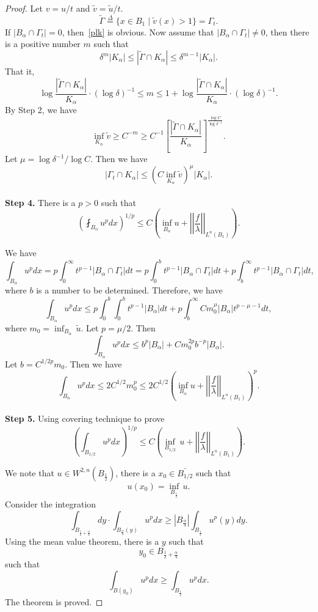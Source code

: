 \begin{proof}
Let $v=u/t$ and $\tilde v=\tilde u/t$.
\[
\tilde\Gamma\overset{\Delta}{=}\{x\in B_1\mid\tilde v(x)>1\}=\Gamma_t.
\]
If $|B_\alpha\cap\Gamma_t|=0$, then~\eqref{plk} is obvious. Now assume that $|B_\alpha\cap\Gamma_t|\neq 0$, then there is a positive number $m$ such that
\[
\delta^m|K_\alpha|\leq|\tilde\Gamma\cap K_\alpha|\leq\delta^{m-1}|K_\alpha|.
\]
That it, 
\[
\log\frac{|\tilde\Gamma\cap K_\alpha|}{K_\alpha}\cdot(\log\delta)^{-1}\leq m\leq
1+\log\frac{|\tilde\Gamma\cap K_\alpha|}{K_\alpha}\cdot(\log\delta)^{-1}.
\]
By Step 2, we have
\[
\inf_{K_\alpha}\tilde v\geq C^{-m}\geq C^{-1}\left[\frac{|\tilde\Gamma\cap K_\alpha|}{K_\alpha}\right]^{\frac{\log C}{\log \delta^{-1}}}.
\]
Let $\mu=\log\delta^{-1}/\log C$.
Then we have
\[
|\Gamma_t\cap K_\alpha|\leq (C\inf_{K_\alpha}\tilde v)^\mu|K_\alpha|.
\]\\


{\bf Step 4.} There is a $p>0$ such that
\[
\left(\fint_{B_\alpha}u^p dx\right)^{1/p}\leq C\left(
\inf_{B_\alpha} u+\left|\left|\frac f\lambda\right|\right|_{L^n(B_1)}\right).
\]

We have
\[
\int_{B_{\alpha}} u^p dx=p\int_0^\infty t^{p-1}|B_\alpha\cap\Gamma_t| dt
=p\int_0^b  t^{p-1}|B_\alpha\cap\Gamma_t| dt+p\int_b^\infty  t^{p-1}|B_\alpha\cap\Gamma_t| dt,
\]
where $b$ is a number to be determined. Therefore, we have
\[
\int_{B_{\alpha}} u^p dx\leq p\int_0^b\int_0^b t^{p-1}|B_\alpha| dt+p\int_b^\infty Cm_0^\mu|B_\alpha| t^{p-\mu-1} dt,
\]
where $m_0={\displaystyle \inf_{B_\alpha}}\,\tilde u$. Let $p=\mu/2$. Then
\[
\int_{B_\alpha} u^p dx\leq b^p|B_\alpha|+Cm_0^{2p}b^{-p}|B_\alpha|.
\]
Let $b=C^{1/2p}m_0$. Then we have
\[
\int_{B_\alpha}u^p dx\leq 2C^{1/2}m_0^p\leq 2C^{1/2}\left(\inf_{B_\alpha} u+\left|\left|\frac f\lambda\right|\right|_{L^n(B_1)}\right)^p.
\]\\



{\bf Step 5.} Using covering technique to prove
\[
\left(\int_{B_{1/2}}u^p dx\right)^{1/p}\leq C\left(\inf_{B_{1/2}} \, u+\left|\left|\frac f\lambda\right|\right|_{L^n(B_1)}\right).
\]

We note that $u\in W^{2,n}(B_{\frac 12})$, there is a $x_0\in\bar{B_{1/2}}$ such that
\[
u(x_0)=\inf_{B_{\frac 12}}\,u.
\]
Consider the integration
\[
\int_{B_{\frac 12+\frac\alpha 4}}dy\cdot\int_{B_{\frac\alpha 4}(y)} u^p dx\geq|B_{\frac \alpha 4}|
\int_{B_{\frac 12}}u^p(y) dy.
\]
Using the mean value theorem, there is a $y$ such that
\[
y_0\in {B_{\frac 12+\frac\alpha 4}}
\]
such that 
\[
\int_{B(y_0)} u^p dx\geq\int_{B_{\frac 12}}u^p dx.
\]
The theorem is proved.

\end{proof}

